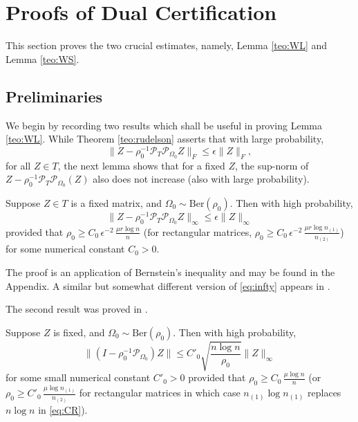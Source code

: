 \section{Proofs of Dual Certification}
\label{sec:lemmas}

This section proves the two crucial estimates, namely, Lemma
\ref{teo:WL} and Lemma \ref{teo:WS}.

\subsection{Preliminaries}

We begin by recording two results which shall be useful in proving Lemma \ref{teo:WL}.  While Theorem \ref{teo:rudelson} asserts that with large probability,
\[
\|Z - \rho_0^{-1} \mathcal{P}_T \mathcal{P}_{\Omega_0} Z\|_F \le \epsilon \|Z\|_F,
\]
for all $Z \in T$, the next lemma shows that for a fixed $Z$, the sup-norm of $Z - \rho_0^{-1} \mathcal{P}_T \mathcal{P}_{\Omega_0}(Z)$ also does not increase (also with large probability).

\begin{lemma}
  \label{teo:infty} 
  Suppose $Z \in T$ is a fixed matrix, and $\Omega_0 \sim
  \text{Ber}(\rho_0)$. Then with  high probability,
   \begin{equation}
    \label{eq:infty} 
    \|Z - \rho_0^{-1} \mathcal{P}_T \mathcal{P}_{\Omega_0} Z\|_\infty \le \epsilon \|Z\|_\infty
  \end{equation}
  provided that $\rho_0 \ge C_0 \, \epsilon^{-2} \, \frac{\mu r \log
    n}{n}$ (for rectangular matrices, $\rho_0 \ge C_0 \, \epsilon^{-2}
  \, \frac{\mu r \log n_{(1)}}{n_{(2)}}$) for some numerical constant $C_0 > 0$.
\end{lemma}

The proof is an application of Bernstein's inequality and may be found in the Appendix. A similar but somewhat different version of
\eqref{eq:infty} appears in \cite{RechtMC}.

The second result was proved in \cite{CR08}.

\begin{lemma}\cite[Theorem 6.3]{CR08}
\label{teo:sixthree}
  Suppose $Z$ is fixed, and $\Omega_0 \sim \text{Ber}(\rho_0)$. Then with high probability,
  \label{teo:CR} 
   \begin{equation}
    \label{eq:CR} 
    \|(I - \rho_0^{-1} \mathcal{P}_{\Omega_0}) Z\| \le C'_0 \sqrt{\frac{n\log n}{\rho_0}} 
    \|Z\|_\infty
  \end{equation}
  for some small numerical constant $C'_0 > 0$ provided that $\rho_0
  \ge C_0 \, \frac{\mu \log n}{n}$ (or $\rho_0 \ge C'_0 \, \frac{\mu
    \log n_{(1)}}{n_{(2)}}$ for rectangular matrices in which case $n_{(1)} \log n_{(1)}$ replaces $n \log n$ in \eqref{eq:CR}).
\end{lemma}

